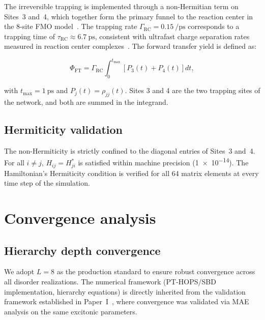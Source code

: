 \documentclass[11pt,a4paper]{article}
\begin{document}
The irreversible trapping is implemented through a non-Hermitian term on Sites~3 and~4, which together form the primary funnel to the reaction center in the 8-site FMO model~\cite{Renger2003,Moix2011}.
The trapping rate $\Gamma_{\mathrm{RC}} = \qty{0.15}{\per\ps}$ corresponds to a trapping time of $\tau_{\mathrm{RC}} \approx \qty{6.7}{\ps}$, consistent with ultrafast charge separation rates measured in reaction center complexes~\cite{Renger2003}.
The forward transfer yield is defined as:

\begin{equation}
\Phi_{\mathrm{FT}} = \Gamma_{\mathrm{RC}} \int_0^{t_{\mathrm{max}}} \left[ P_3(t) + P_4(t) \right] dt,
\label{eq:SI_phi_ft}
\end{equation}

with $t_{\mathrm{max}} = \qty{1}{\ps}$ and $P_j(t) = \rho_{jj}(t)$.
Sites 3 and 4 are the two trapping sites of the network, and both are summed in the integrand.

\subsection{Hermiticity validation}

The non-Hermiticity is strictly confined to the diagonal entries of Sites~3 and~4.
For all $i \neq j$, $H_{ij} = H_{ji}^*$ is satisfied within machine precision (\num{1e-14}).
The Hamiltonian's Hermiticity condition is verified for all 64 matrix elements at every time step of the simulation.


\section{Convergence analysis}
\label{SI-sec:convergence}

\subsection{Hierarchy depth convergence}
We adopt $L=8$ as the production standard to ensure robust convergence across all disorder realizations. The numerical framework (PT-HOPS/SBD implementation, hierarchy equations) is directly inherited from the validation framework established in Paper~I~\cite{Kouam2026}, where convergence was validated via MAE analysis on the same excitonic parameters.
\end{document}
